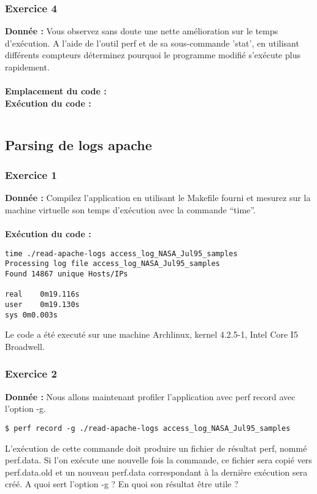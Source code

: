 \subsubsection{Exercice 4}
\textbf{Donnée : } Vous	observez	sans	doute	une	nette	amélioration	sur	le	temps	d'exécution.
A	l'aide	de	l'outil	perf	et	de	sa	sous-commande	'stat',	en	utilisant	différents	compteurs	déterminez	
pourquoi	le	programme	modifié	s'exécute	plus	rapidement.\\\\
\textbf{Emplacement du code : } \textit{}\\

\textbf{Exécution du code : } \\
\begin{lstlisting}

\end{lstlisting}

\subsection{Parsing de logs apache}
\subsubsection{Exercice 1}
\textbf{Donnée : } Compilez	l'application	en	utilisant	le	Makefile	fourni	et	mesurez sur	la	machine	virtuelle son	temps	
d'exécution	avec	la	commande	“time”.\\\\

\textbf{Exécution du code : } \\
\begin{lstlisting}
time ./read-apache-logs access_log_NASA_Jul95_samples 
Processing log file access_log_NASA_Jul95_samples
Found 14867 unique Hosts/IPs

real	0m19.116s
user	0m19.130s
sys	0m0.003s
\end{lstlisting}
Le code a été executé sur une machine Archlinux, kernel 4.2.5-1, Intel Core I5 Broadwell.

\subsubsection{Exercice 2}
\textbf{Donnée : } Nous	allons	maintenant	profiler	l'application	avec	perf	record	avec	l'option	-g.
\begin{lstlisting}
$ perf record -g ./read-apache-logs access_log_NASA_Jul95_samples
\end{lstlisting}
L'exécution	de	cette	commande	doit	produire	un	fichier	de	résultat	perf,	nommé	perf.data.	Si	l'on	
exécute	une	nouvelle	fois	la	commande,	ce	fichier	sera	copié	vers	perf.data.old et	un	nouveau	
perf.data	correspondant	à	la	dernière	exécution	sera	créé.
A	quoi	sert	l'option	-g	?	En	quoi	son	résultat	être	utile	?\\\\

